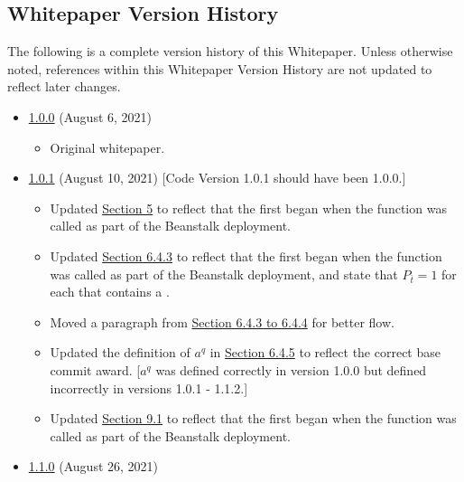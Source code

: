 \documentclass[class=article, crop=false]{standalone}
\begin{document}
\subsection{Whitepaper Version History}
The following is a complete version history of this Whitepaper. Unless otherwise noted, references within this Whitepaper Version History are not updated to reflect later changes.

\begin{itemize}[topsep=0pt, itemsep=3pt,leftmargin=16pt]
    \item \href{https://github.com/BeanstalkFarms/Beanstalk/blob/master/version-history/beanstalk1_0_0.pdf}{1.0.0} (August 6, 2021)
    \begin{itemize}
        \item Original whitepaper.
    \end{itemize}
    \item \href{https://github.com/BeanstalkFarms/Beanstalk/blob/master/version-history/beanstalk1_0_1.pdf}{1.0.1} (August 10, 2021) [Code Version 1.0.1 should have been 1.0.0.]
    \begin{itemize}
        \item Updated \hyperlink{section.5}{Section 5} to reflect that the first  began when the  function was called as part of the Beanstalk deployment.
        \item Updated \hyperlink{subsubsection.6.4.3}{Section 6.4.3} to reflect that the first  began when the  function was called as part of the Beanstalk deployment, and state that $P_{\overline{t}} = 1$ for each  that contains a .
        \item Moved a paragraph from \hyperlink{subsubsection.6.4.3}{Section 6.4.3 to 6.4.4} for better flow.
        \item Updated the definition of $a^q$ in \hyperlink{subsubsection.6.4.5}{Section 6.4.5} to reflect the correct base commit award. [$a^q$ was defined correctly in version 1.0.0 but defined incorrectly in versions 1.0.1 - 1.1.2.]
        \item Updated \hyperlink{subsection.9.1}{Section 9.1} to reflect that the first  began when the  function was called as part of the Beanstalk deployment.
    \end{itemize}
    \item \href{https://github.com/BeanstalkFarms/Beanstalk/blob/master/version-history/beanstalk1_1_0.pdf}{1.1.0} (August 26, 2021)
    \begin{itemize}

\end{itemize}
\end{itemize}
\end{document}
